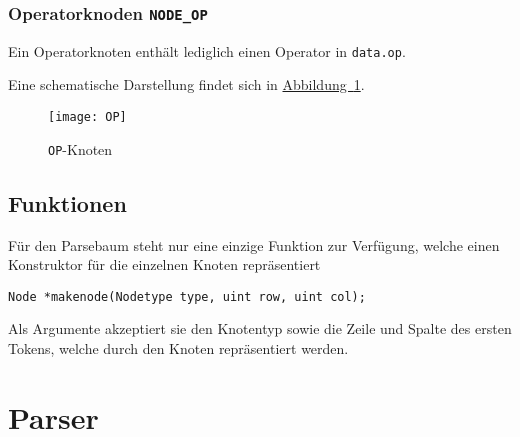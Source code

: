\subsubsection{Operatorknoden \texttt{NODE\_OP}}
\label{sec:opnode}
Ein Operatorknoten enthält lediglich einen Operator in \texttt{data.op}.

Eine schematische Darstellung findet sich in \hyperref[fig:opnode]{Abbildung~\ref{fig:opnode}}.

\begin{figure}[h!]
\label{fig:opnode}
\centering
\texttt{[image: OP]}
\caption{\texttt{OP}-Knoten}
\end{figure}

\subsection{Funktionen}

Für den Parsebaum steht nur eine einzige Funktion zur Verfügung,
welche einen Konstruktor für die einzelnen Knoten repräsentiert

\begin{lstlisting}
Node *makenode(Nodetype type, uint row, uint col);
\end{lstlisting}

Als Argumente akzeptiert sie den Knotentyp sowie die Zeile und Spalte des ersten Tokens,
welche durch den Knoten repräsentiert werden.

\section{Parser}
